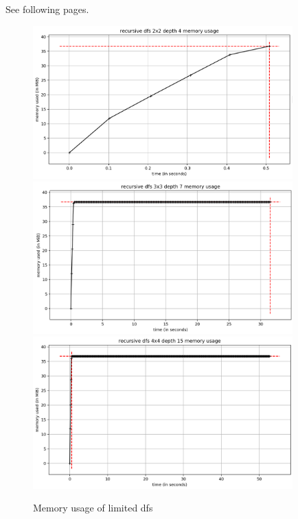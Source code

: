 \documentclass[runningheads]{llncs}
\begin{document}
See following pages.

\begin{figure}
    \centering
    \includegraphics[width=10cm]{images/dfs-2x2.png}
    \includegraphics[width=10cm]{images/dfs-3x3.png}
    \includegraphics[width=10cm]{images/dfs-4x4.png}
    \caption{Memory usage of limited dfs} \label{fig1}
\end{figure}
\end{document}
